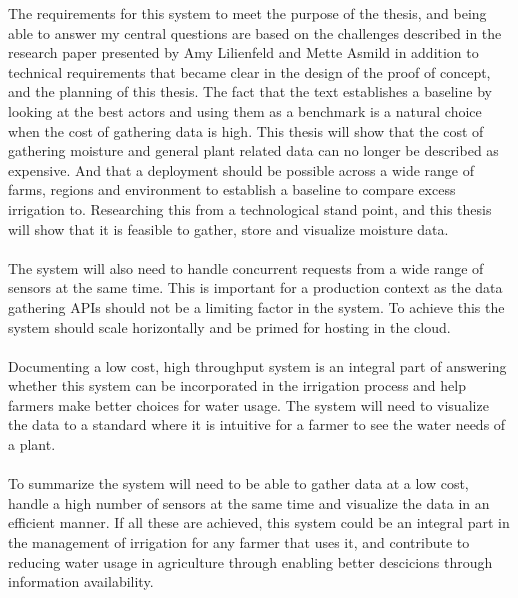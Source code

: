 \documentclass[]{uiophd}
\begin{document}
The requirements for this system to meet the purpose of the thesis, and being able to answer my central questions are based on the challenges described in the research paper presented by Amy Lilienfeld and Mette Asmild in addition to technical requirements that became clear in the design of the proof of concept, and the planning of this thesis. The fact that the text establishes a baseline by looking at the best actors and using them as a benchmark is a natural choice when the cost of gathering data is high. This thesis will show that the cost of gathering moisture and general plant related data can no longer be described as expensive. And that a deployment should be possible across a wide range of farms, regions and environment to establish a baseline to compare excess irrigation to. Researching this from a technological stand point, and this thesis will show that it is feasible to gather, store and visualize moisture data.
\\\\
The system will also need to handle concurrent requests from a wide range of sensors at the same time. This is important for a production context as the data gathering APIs should not be a limiting factor in the system. To achieve this the system should scale horizontally and be primed for hosting in the cloud.
\\\\
Documenting a low cost, high throughput system is an integral part of answering whether this system can be incorporated in the irrigation process and help farmers make better choices for water usage. The system will need to visualize the data to a standard where it is intuitive for a farmer to see the water needs of a plant.
\\\\
To summarize the system will need to be able to gather data at a low cost, handle a high number of sensors at the same time and visualize the data in an efficient manner. If all these are achieved, this system could be an integral part in the management of irrigation for any farmer that uses it, and contribute to reducing water usage in agriculture through enabling better descicions through information availability.
\end{document}
